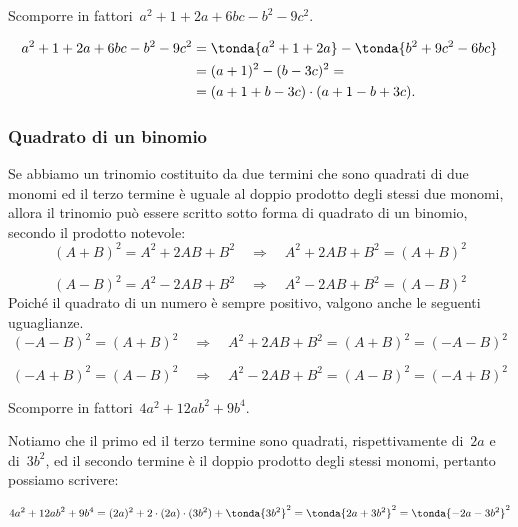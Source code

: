 \begin{esempio}{}{}
Scomporre in fattori~\(a^{2}+1+2a+6bc-b^{2}-9c^{2}\).

\vspace{-1.0em}
\begin{equation*}
  \begin{split}
    a^{2}+1+2a+6bc-b^{2}-9c^{2} 
    &=\tonda{a^{2}+1+2a}-\tonda{b^{2}+9c^{2}-6{bc}} \\
    &= (a+1)^{2}-(b-3c)^{2}=\\
    &= (a+1+b-3c)\cdot (a+1-b+3c).
  \end{split}
\end{equation*}
\end{esempio}
% 

\subsubsection{Quadrato di un binomio}
\label{subsubsec:divpol_quadbin}

Se abbiamo un trinomio costituito da due termini che sono quadrati di 
due monomi ed il terzo termine è uguale al doppio prodotto degli stessi 
due monomi, allora il trinomio può essere scritto sotto forma di 
quadrato di un binomio, secondo il prodotto notevole:
\[(A+B)^{2}=A^{2}+2AB+B^{2}\quad \Rightarrow \quad 
  A^{2}+2AB+B^{2}=(A+B)^{2}\]

\vspace{-2.0em}
\[(A-B)^{2}=A^{2}-2AB+B^{2}\quad \Rightarrow \quad 
  A^{2}-2AB+B^{2}=(A-B)^{2}\]
Poiché il quadrato di un numero è sempre positivo, valgono anche le 
seguenti uguaglianze.
\[(-A-B)^{2}=(A+B)^{2}\quad\Rightarrow\quad 
  A^{2}+2AB+B^{2}=(A+B)^{2}=(-A-B)^{2}\]

\vspace{-3.0em}               %
\[(-A+B)^{2}=(A-B)^{2}\quad \Rightarrow \quad 
A^{2}-2AB+B^{2}=(A-B)^{2}=(-A+B)^{2}\]

\begin{esempio}{}{}
Scomporre in fattori~\(4a^{2}+12ab^{2}+9b^{4}\).

Notiamo che il primo ed il terzo termine sono quadrati, rispettivamente 
di~\(2a\) e di~\(3b^{2}\), ed il secondo termine è il doppio prodotto 
degli stessi monomi, pertanto possiamo scrivere:

\vspace{-2.0em}
\[4a^{2}+12{ab}^{2}+9b^{4}=(2a)^{2}+2 \cdot (2a) \cdot (3b^{2})+
  \tonda{3b^{2}}^{2}=\tonda{2a+3b^{2}}^{2}=\tonda{-2a-3b^{2}}^{2}\]
\end{esempio}

